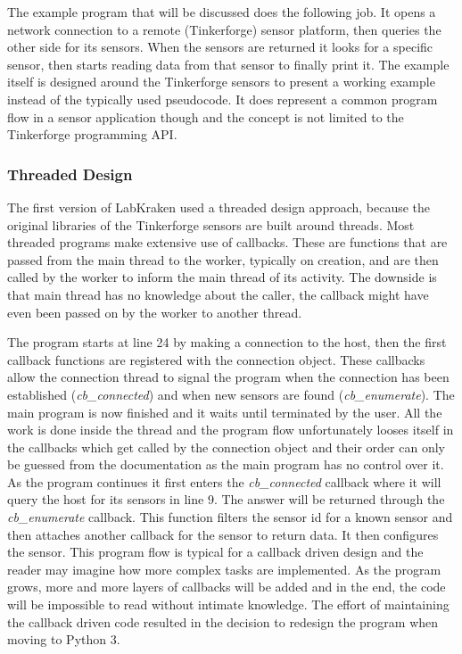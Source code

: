 The example program that will be discussed does the following job. It opens a network connection to a remote (Tinkerforge) sensor platform, then queries the other side for its sensors. When the sensors are returned it looks for a specific sensor, then starts reading data from that sensor to finally print it. The example itself is designed around the Tinkerforge sensors to present a working example instead of the typically used pseudocode. It does represent a common program flow in a sensor application though and the concept is not limited to the Tinkerforge programming API.

\subsubsection{Threaded Design}
The first version of LabKraken used a threaded design approach, because the original libraries of the Tinkerforge sensors are built around threads. Most threaded programs make extensive use of callbacks. These are functions that are passed from the main thread to the worker, typically on creation, and are then called by the worker to inform the main thread of its activity. The downside is that main thread has no knowledge about the caller, the callback might have even been passed on by the worker to another thread.



The program starts at line \num{24} by making a connection to the host, then the first callback functions are registered with the connection object. These callbacks allow the connection thread to signal the program when the connection has been established (\textit{cb\_connected}) and when new sensors are found (\textit{cb\_enumerate}). The main program is now finished and it waits until terminated by the user. All the work is done inside the thread and the program flow unfortunately looses itself in the callbacks which get called by the connection object and their order can only be guessed from the documentation as the main program has no control over it. As the program continues it first enters the \textit{cb\_connected} callback where it will query the host for its sensors in line \num{9}. The answer will be returned through the \textit{cb\_enumerate} callback. This function filters the sensor id for a known sensor and then attaches another callback for the sensor to return data. It then configures the sensor. This program flow is typical for a callback driven design and the reader may imagine how more complex tasks are implemented. As the program grows, more and more layers of callbacks will be added and in the end, the code will be impossible to read without intimate knowledge. The effort of maintaining the callback driven code resulted in the decision to redesign the program when moving to Python 3.

